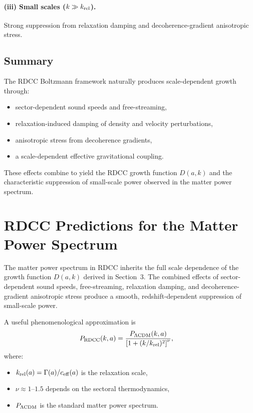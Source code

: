 \documentclass[11pt,a4paper]{article}
\begin{document}
\paragraph{(iii) Small scales ($k \gg k_{\rm rel}$).}
Strong suppression from relaxation damping and decoherence-gradient anisotropic stress.

\subsection{Summary}

The RDCC Boltzmann framework naturally produces scale-dependent growth through:
\begin{itemize}
\item sector-dependent sound speeds and free-streaming,
\item relaxation-induced damping of density and velocity perturbations,
\item anisotropic stress from decoherence gradients,
\item a scale-dependent effective gravitational coupling.
\end{itemize}

These effects combine to yield the RDCC growth function $D(a,k)$ and the characteristic
suppression of small-scale power observed in the matter power spectrum.
\section{RDCC Predictions for the Matter Power Spectrum}

The matter power spectrum in RDCC inherits the full scale dependence of the growth
function $D(a,k)$ derived in Section~3. The combined effects of sector-dependent sound
speeds, free-streaming, relaxation damping, and decoherence-gradient anisotropic stress
produce a smooth, redshift-dependent suppression of small-scale power.

A useful phenomenological approximation is
\begin{equation}
P_{\rm RDCC}(k,a)
= \frac{P_{\Lambda{\rm CDM}}(k,a)}
{\left[1 + (k/k_{\rm rel})^2\right]^{\nu}},
\end{equation}
where:
\begin{itemize}
\item $k_{\rm rel}(a) = \Gamma(a)/c_{\rm eff}(a)$ is the relaxation scale,
\item $\nu \approx 1$–$1.5$ depends on the sectoral thermodynamics,
\item $P_{\Lambda{\rm CDM}}$ is the standard matter power spectrum.
\end{itemize}
\end{document}
